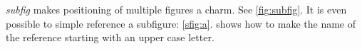 \emph{subfig} makes positioning of multiple figures a charm.
See \cref{fig:subfig}.
It is even possible to simple reference a subfigure: \cref{sfig:a}.
 shows how to make the name of the reference starting with an
upper case letter.

